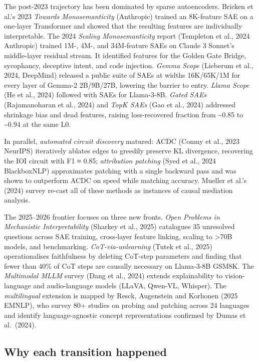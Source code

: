 The post-2023 trajectory has been dominated by sparse autoencoders. Bricken et al.'s 2023 \emph{Towards Monosemanticity} (Anthropic) trained an 8K-feature SAE on a one-layer Transformer and showed that the resulting features are individually interpretable. The 2024 \emph{Scaling Monosemanticity} report (Templeton et al., 2024 Anthropic) trained 1M-, 4M-, and 34M-feature SAEs on Claude 3 Sonnet's middle-layer residual stream. It identified features for the Golden Gate Bridge, sycophancy, deceptive intent, and code injection. \emph{Gemma Scope} (Lieberum et al., 2024, DeepMind) released a public suite of SAEs at widths 16K/65K/1M for every layer of Gemma-2 2B/9B/27B, lowering the barrier to entry. \emph{Llama Scope} (He et al., 2024) followed with SAEs for Llama-3-8B. \emph{Gated SAEs} (Rajamanoharan et al., 2024) and \emph{TopK SAEs} (Gao et al., 2024) addressed shrinkage bias and dead features, raising loss-recovered fraction from \textasciitilde0.85 to \textasciitilde0.94 at the same L0.

In parallel, \emph{automated circuit discovery} matured: ACDC (Conmy et al., 2023 NeurIPS) iteratively ablates edges to greedily preserve KL divergence, recovering the IOI circuit with F1 ≈ 0.85; \emph{attribution patching} (Syed et al., 2024 BlackboxNLP) approximates patching with a single backward pass and was shown to outperform ACDC on speed while matching accuracy. Mueller et al.'s (2024) survey re-cast all of these methods as instances of causal mediation analysis.

The 2025--2026 frontier focuses on three new fronts. \emph{Open Problems in Mechanistic Interpretability} (Sharkey et al., 2025) catalogues 35 unresolved questions across SAE training, cross-layer feature linking, scaling to \textgreater70B models, and benchmarking. \emph{CoT-via-unlearning} (Tutek et al., 2025) operationalises faithfulness by deleting CoT-step parameters and finding that fewer than 40\% of CoT steps are causally necessary on Llama-3-8B GSM8K. The \emph{Multimodal MLLM} survey (Dang et al., 2024) extends explainability to vision-language and audio-language models (LLaVA, Qwen-VL, Whisper). The \emph{multilingual} extension is mapped by Resck, Augenstein and Korhonen (2025 EMNLP), who survey 80+ studies on probing and patching across 24 languages and identify language-agnostic concept representations confirmed by Dumas et al.~(2024).

\subsection{Why each transition happened}\label{why-each-transition-happened}

